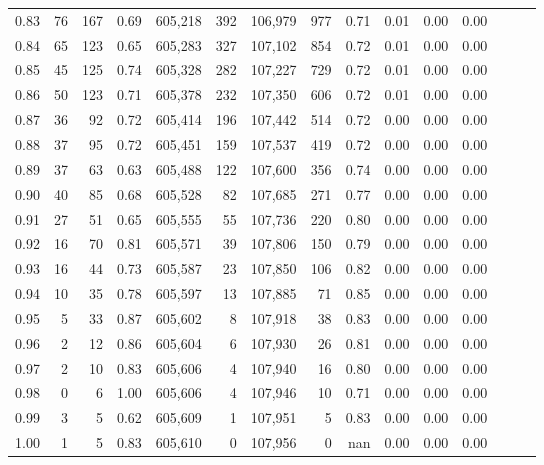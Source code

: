 \begin{tabular}{rrrrrrrrrrrrrrr}
0.83 &      76 &    167 &  0.69 &  605,218 &      392 &  106,979 &      977 &  0.71 &  0.01 &  0.00 &      0.00 \\
0.84 &      65 &    123 &  0.65 &  605,283 &      327 &  107,102 &      854 &  0.72 &  0.01 &  0.00 &      0.00 \\
0.85 &      45 &    125 &  0.74 &  605,328 &      282 &  107,227 &      729 &  0.72 &  0.01 &  0.00 &      0.00 \\
0.86 &      50 &    123 &  0.71 &  605,378 &      232 &  107,350 &      606 &  0.72 &  0.01 &  0.00 &      0.00 \\
0.87 &      36 &     92 &  0.72 &  605,414 &      196 &  107,442 &      514 &  0.72 &  0.00 &  0.00 &      0.00 \\
0.88 &      37 &     95 &  0.72 &  605,451 &      159 &  107,537 &      419 &  0.72 &  0.00 &  0.00 &      0.00 \\
0.89 &      37 &     63 &  0.63 &  605,488 &      122 &  107,600 &      356 &  0.74 &  0.00 &  0.00 &      0.00 \\
0.90 &      40 &     85 &  0.68 &  605,528 &       82 &  107,685 &      271 &  0.77 &  0.00 &  0.00 &      0.00 \\
0.91 &      27 &     51 &  0.65 &  605,555 &       55 &  107,736 &      220 &  0.80 &  0.00 &  0.00 &      0.00 \\
0.92 &      16 &     70 &  0.81 &  605,571 &       39 &  107,806 &      150 &  0.79 &  0.00 &  0.00 &      0.00 \\
0.93 &      16 &     44 &  0.73 &  605,587 &       23 &  107,850 &      106 &  0.82 &  0.00 &  0.00 &      0.00 \\
0.94 &      10 &     35 &  0.78 &  605,597 &       13 &  107,885 &       71 &  0.85 &  0.00 &  0.00 &      0.00 \\
0.95 &       5 &     33 &  0.87 &  605,602 &        8 &  107,918 &       38 &  0.83 &  0.00 &  0.00 &      0.00 \\
0.96 &       2 &     12 &  0.86 &  605,604 &        6 &  107,930 &       26 &  0.81 &  0.00 &  0.00 &      0.00 \\
0.97 &       2 &     10 &  0.83 &  605,606 &        4 &  107,940 &       16 &  0.80 &  0.00 &  0.00 &      0.00 \\
0.98 &       0 &      6 &  1.00 &  605,606 &        4 &  107,946 &       10 &  0.71 &  0.00 &  0.00 &      0.00 \\
0.99 &       3 &      5 &  0.62 &  605,609 &        1 &  107,951 &        5 &  0.83 &  0.00 &  0.00 &      0.00 \\
1.00 &       1 &      5 &  0.83 &  605,610 &        0 &  107,956 &        0 &   nan &  0.00 &  0.00 &      0.00 \\
\bottomrule
\end{tabular}
